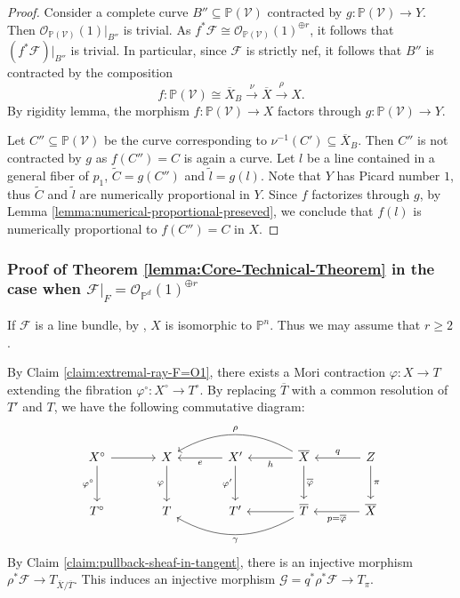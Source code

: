 \documentclass[english,reqno]{amsart}
\newcommand\bbP{{\mathbb P}}
\newcommand\sF{{\mathscr F}}
\newcommand\sG{{\mathscr G}}
\newcommand\sO{{\mathscr O}}
\newcommand\sV{{\mathscr V}}
\theoremstyle{plain}
\theoremstyle{definition}
\numberwithin{equation}{section} %
\begin{document}
\begin{proof}
	Consider a complete curve $B'' \subseteq \bbP(\sV)$ contracted by $g\colon \bbP(\sV)\rightarrow Y$. Then $\sO_{\bbP(\sV)}(1)\vert_{B''}$ is trivial. As $f^*\sF \cong \sO_{\bbP(\sV)}(1)^{\oplus r}$, it follows that $(f^*\sF)\vert_{B''}$ is trivial. In particular, since $\sF$ is strictly nef, it follows that $B''$ is contracted by the composition
	\[
	f\colon \bbP(\sV) \cong \overline{X}_{B}\xrightarrow{\nu}\overline{X}\xrightarrow{\rho} X.
	\]
	By rigidity lemma, the morphism $f\colon \bbP(\sV)\rightarrow X$ factors through $g\colon \bbP(\sV)\rightarrow Y$.
	
	Let $C'' \subseteq \bbP(\sV)$ be the curve corresponding to $\nu^{-1}(C') \subseteq \overline{X}_B$.
	Then  $C''$ is not contracted by $g$ as  $f(C'')=C$ is again a curve. Let $l$ be a line contained in a general fiber of $p_1$,   $\widetilde{C} = g(C'')$ and  $\widetilde{l} = g(l)$. Note that $Y$  has Picard number $1$, thus $\widetilde{C}$ and $\widetilde{l}$ are numerically proportional in $Y$.
	Since $f$ factorizes through $g$, by   Lemma \ref{lemma:numerical-proportional-preseved}, we conclude that $f(l)$ is numerically proportional to $f(C'')=C$ in $X$.
\end{proof}

\subsubsection{Proof of Theorem \ref{lemma:Core-Technical-Theorem} in the case when $\sF\vert_F=\sO_{\bbP^d}(1)^{\oplus r}$}

 

\label{section:step-3-case-2}

If $\sF$ is a line bundle, by \cite[Corollaire]{Druel2004}, 
$X$ is isomorphic to $\bbP^n$. Thus we may assume that $r\geqslant 2$.

By Claim \ref{claim:extremal-ray-F=O1}, there exists a Mori contraction $\varphi\colon X\rightarrow T$ extending the   fibration $\varphi^\circ\colon X^\circ\rightarrow T^\circ$. By replacing $\overline{T}$   with a common resolution of $T'$ and $T$, we have the following commutative diagram:
\[
\begin{tikzcd}[column sep=large, row sep=large]
X^\circ \dar[swap]{\varphi^\circ}\rar &
X\dar[swap]{\varphi} & X' \lar{e}\dar[swap]{\varphi'}
& \overline{X} \lar{h} \arrow[bend right]{ll}[swap]{\rho} \dar{\overline{\varphi}}    &
Z\lar[swap]{q}\dar{\pi}
\\
T^\circ & T &
T' &
\overline{T} \lar \arrow[bend left]{ll}{\gamma} &
\overline{X}\lar{p=\overline{\varphi}}
\end{tikzcd}
\]
By Claim \ref{claim:pullback-sheaf-in-tangent}, there is an injective morphism $\rho^*\sF\rightarrow T_{\overline{X}/\overline{T}}$.
This induces an injective morphism $\sG = q^*\rho^*\sF\rightarrow T_{\pi}$.
\end{document}
